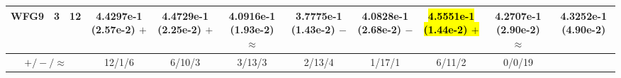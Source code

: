 \documentclass[journal]{IEEEtran}
\begin{document}
\begin{table*}[htbp]
\begin{tabular}{ccccccccccc}
\hline
\multirow{1}{*}{WFG9}&3&12&4.4297e-1 (2.57e-2) $+$&4.4729e-1 (2.25e-2) $+$&4.0916e-1 (1.93e-2) $\approx$&3.7775e-1 (1.43e-2) $-$&4.0828e-1 (2.68e-2) $-$&\hl{4.5551e-1 (1.44e-2) $+$}&4.2707e-1 (2.90e-2) $\approx$&4.3252e-1 (4.90e-2)\\
\hline
\multicolumn{3}{c}{$+/-/\approx$}&12/1/6&6/10/3&3/13/3&2/13/4&1/17/1&6/11/2&0/0/19&\\
\bottomrule
\end{tabular}
\label{No Label}
\end{table*}
\end{document}
